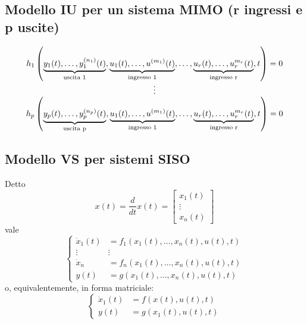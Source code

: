 \documentclass{book}
\begin{document}
\subsection{Modello IU per un sistema MIMO (r ingressi e p uscite)}
  \begin{equation*}
    \begin{matrix}
      h_1\left(\underbrace{y_1(t),\dots,y_1^{(n_1)}(t)}_{\text{\shortstack{uscita 1}}}, \underbrace{u_1(t),\dots,u^{(m_1)}(t)}_{\text{\shortstack{ingresso 1}}},\dots, \underbrace{u_r(t),\dots,u_r^{m_r}(t)}_{\text{\shortstack{ingresso r}}},t\right)=0\\
      \vdots\\
      h_p\left(\underbrace{y_p(t),\dots,y_p^{(n_p)}(t)}_{\text{\shortstack{uscita p}}}, \underbrace{u_1(t),\dots,u^{(m_1)}(t)}_{\text{\shortstack{ingresso 1}}},\dots, \underbrace{u_r(t),\dots,u_r^{m_r}(t)}_{\text{\shortstack{ingresso r}}}, t\right)=0
    \end{matrix}
  \end{equation*}
  \subsection{Modello VS per sistemi SISO}
  Detto
  \begin{equation*}
    x(t)=\frac{d}{dt}x(t)=\begin{bmatrix}
                            x_1(t)\\
                            \vdots\\
                            x_n(t)
                          \end{bmatrix}
  \end{equation*}
  vale
  \begin{equation*}
    \begin{cases}
      \dot{x}_1(t) & = f_1(x_1(t),\dots,x_n(t),u(t),t)\\
      \vdots & \vdots\\
      \dot{x}_n & = f_n(x_1(t),\dots,x_n(t),u(t),t)\\
      y(t) & = g(x_1(t),\dots, x_n(t),u(t),t)
    \end{cases}
  \end{equation*}
  o, equivalentemente, in forma matriciale:
   \begin{equation*}
    \begin{cases}
      \dot{x}_1(t) & = f(x(t),u(t),t)\\
      y(t) & = g(x_1(t), u(t),t)
    \end{cases}
  \end{equation*}
\end{document}
